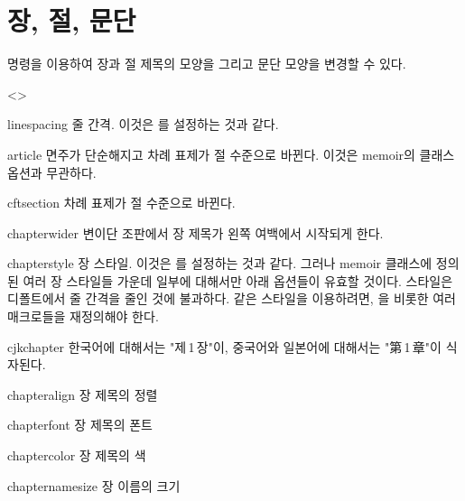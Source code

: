 \documentclass[minted]{hzguide}
\begin{document}
\section{장, 절, 문단}

\macro{\HeadingSetup} 명령을 이용하여 장과 절 제목의 모양을 그리고 문단 모양을 변경할 수 있다. 

\begin{code}
\end{code}

\begin{macros}<\HeadingSetup>
\item[linespacing]  
줄 간격. 이것은 \macro{\baselinestretch}를 설정하는 것과 같다.

\item[article] \keyvalueTF
면주가 단순해지고 차례 표제가 절 수준으로 바뀐다. 
이것은 memoir의  클래스 옵션과 무관하다.

\item[cftsection] \keyvalueTF
차례 표제가 절 수준으로 바뀐다. 

\item[chapterwider] \keyvalueTF
변이단 조판에서 장 제목가 왼쪽 여백에서 시작되게 한다.

\item[chapterstyle] 
장 스타일. 이것은 \macro{\chapterstyle}를 설정하는 것과 같다. 
그러나 memoir 클래스에 정의된 여러 장 스타일들 가운데 일부에 대해서만 아래 옵션들이 유효할 것이다.
 스타일은 디폴트에서 줄 간격을 줄인 것에 불과하다.
 같은 스타일을 이용하려면, \macro{\printerchaptername}을 비롯한 여러 매크로들을 재정의해야 한다.

\item[cjkchapter] \keyvalueTF
한국어에 대해서는 "제\,1\,장"이, 중국어와 일본어에 대해서는 "第\,1\,章"이 식자된다.

\item[chapteralign] \keyvalue{\raggedleft, \centering, \raggedright}
장 제목의 정렬

\item[chapterfont] \keyvalue{\normalfont\bfseries}
장 제목의 폰트

\item[chaptercolor] 
장 제목의 색

\item[chapternamesize] \keyvalue{\huge}
장 이름의 크기 


\end{macros}
\end{document}

